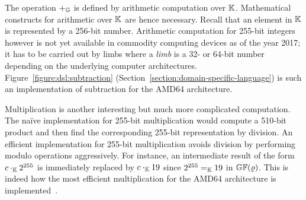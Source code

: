  
The operation $+_{\mathbb{G}}$ is defined by arithmetic computation over
$\mathbb{K}$. %
Mathematical constructs for
arithmetic over $\mathbb{K}$ are hence necessary. Recall that
an element in $\mathbb{K}$ is represented by a 256-bit number. 
Arithmetic computation for 255-bit integers however is not yet
available in commodity computing devices as of the year
2017; it has to be carried out by limbs where a
\emph{limb} is a 32- or 64-bit number depending on the underlying
computer architectures. Figure~\ref{figure:dsl:subtraction}
(Section~\ref{section:domain-specific-language}) is such an
implementation of subtraction for the AMD64 architecture. 



Multiplication is another interesting but much more
complicated computation. The na\"ive implementation for 255-bit
multiplication would compute a 510-bit product and then find the
corresponding 255-bit representation by division. 
An efficient implementation for 255-bit multiplication avoids
division by performing modulo operations aggressively. 
For instance, an intermediate
result of the form $c \cdot_{\mathbb{K}} 2^{255}$ is immediately replaced by
$c \cdot_{\mathbb{K}} 19$ since $2^{255} =_{\mathbb{K}} 19$ in $\mathbb{GF}(\varrho)$. 
This is indeed how the most efficient multiplication for the AMD64
architecture is implemented~\cite{BDL+:11:HSHSS,BDL+:12:HSHSS}.


